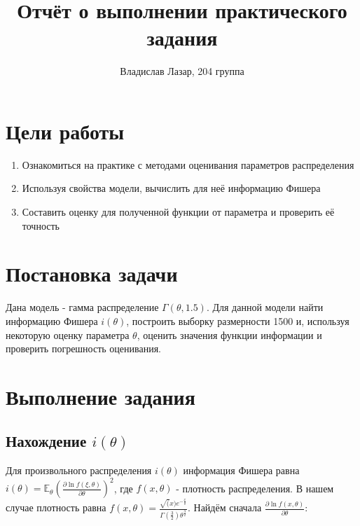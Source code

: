 \documentclass{article}
\title{Отчёт о выполнении практического задания}
\author{Владислав Лазар, 204 группа}
\begin{document}
\maketitle

\section{Цели работы}
\begin{enumerate}
    \item Ознакомиться на практике с методами оценивания параметров распределения
    \item Используя свойства модели, вычислить для неё информацию Фишера
    \item Составить оценку для полученной функции от параметра и проверить её точность
\end{enumerate}

\section{Постановка задачи}

Дана модель - гамма распределение $\Gamma(\theta, 1.5)$. Для данной модели найти информацию Фишера $i(\theta)$, построить выборку размерности 1500 и, используя  некоторую оценку параметра $\theta$, оценить значения функции информации и проверить погрешность оценивания.

\section{Выполнение задания}
\subsection{Нахождение $i(\theta)$}

Для произвольного распределения $i(\theta)$ информация Фишера равна $i(\theta) = \mathbb{E}_{\theta}(\frac{\partial \ln{f(\xi, \theta)}}{\partial \theta})^2$, где $f(x, \theta)$ - плотность распределения. В нашем случае плотность равна $f(x, \theta) = \frac{\sqrt(x)e^{-\frac{x}{\theta}}}{\Gamma(\frac{3}{2})\theta^{\frac{3}{2}}}$.
Найдём сначала $\frac{\partial\ln{f(x, \theta)}}{\partial \theta}$:
\end{document}
